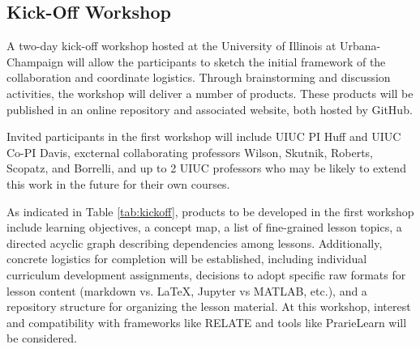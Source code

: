 \documentclass[11pt]{article}
\begin{document}
          \subsection{Kick-Off Workshop}
          A two-day kick-off workshop hosted at the University of Illinois at 
          Urbana-Champaign will allow the 
          participants to sketch the initial framework of 
          the collaboration and coordinate logistics. Through brainstorming and 
          discussion activities, the workshop will deliver a number of 
          products. These products will be published in an online repository 
          and associated website, both hosted by GitHub. 

          Invited participants in the first workshop will include UIUC PI Huff 
          and UIUC Co-PI Davis, excternal collaborating professors Wilson, 
          Skutnik, Roberts, Scopatz, and Borrelli, and up to 2 UIUC professors 
          who may be likely to extend this work in the future for their own 
          courses.

          As indicated in Table \ref{tab:kickoff}, products to be developed in the first workshop include learning 
          objectives\cite{bloom_bloom_1984}, a concept 
          map\cite{novak_concept_1990}, a list of fine-grained lesson topics, a 
          directed acyclic graph describing dependencies among lessons. Additionally, concrete logistics 
          for completion will be established, including individual curriculum 
          development assignments, decisions to adopt specific raw formats 
          for lesson content (markdown vs. \LaTeX, Jupyter vs MATLAB, etc.), 
          and a repository structure for organizing the lesson material. At 
          this workshop, interest and compatibility with frameworks like RELATE 
          \cite{kloeckner_relate_2017,kloeckner_relate_2017} and tools like 
          PrarieLearn \cite{west_prairielearn:_2015} will be considered.
          
\end{document}
